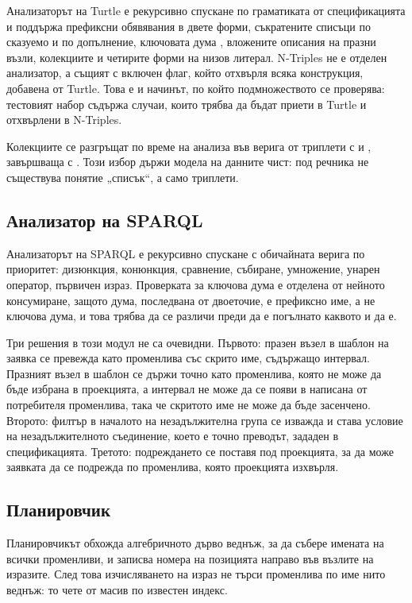 Анализаторът на Turtle е рекурсивно спускане по граматиката от спецификацията и
поддържа префиксни обявявания в двете форми, съкратените списъци по сказуемо и по
допълнение, ключовата дума , вложените описания на празни възли, колекциите и
четирите форми на низов литерал. N-Triples не е отделен анализатор, а същият с включен
флаг, който отхвърля всяка конструкция, добавена от Turtle. Това е и начинът, по който
подмножеството се проверява: тестовият набор съдържа случаи, които трябва да бъдат
приети в Turtle и отхвърлени в N-Triples.

Колекциите се разгръщат по време на анализа във верига от триплети с  и
, завършваща с . Този избор държи модела на данните чист:
под речника не съществува понятие „списък“, а само триплети.

\subsection{Анализатор на SPARQL}

Анализаторът на SPARQL е рекурсивно спускане с обичайната верига по приоритет:
дизюнкция, конюнкция, сравнение, събиране, умножение, унарен оператор, първичен израз.
Проверката за ключова дума е отделена от нейното консумиране, защото дума, последвана
от двоеточие, е префиксно име, а не ключова дума, и това трябва да се различи преди да
е погълнато каквото и да е.

Три решения в този модул не са очевидни. Първото: празен възел в шаблон на заявка се
превежда като променлива със скрито име, съдържащо интервал. Празният възел в шаблон
се държи точно като променлива, която не може да бъде избрана в проекцията, а интервал
не може да се появи в написана от потребителя променлива, така че скритото име не може
да бъде засенчено. Второто: филтър в началото на незадължителна група се изважда и става
условие на незадължителното съединение, което е точно преводът, зададен в
спецификацията. Третото: подреждането се поставя под проекцията, за да може заявката да
се подрежда по променлива, която проекцията изхвърля.

\subsection{Планировчик}

Планировчикът обхожда алгебричното дърво веднъж, за да събере имената на всички
променливи, и записва номера на позицията направо във възлите на изразите. След това
изчисляването на израз не търси променлива по име нито веднъж: то чете от масив по
известен индекс.

